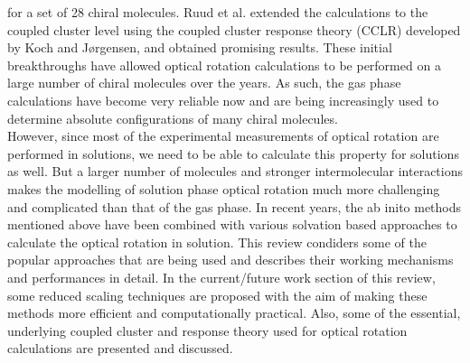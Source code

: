 for a set of 28 chiral molecules. Ruud et al. extended the calculations to the
coupled cluster level using the coupled cluster response
theory (CCLR) developed by Koch and J{\o}rgensen\cite{Koch90},
and obtained promising results\cite{Ruud03}. These initial breakthroughs have allowed optical
rotation calculations to be performed on a large number of chiral molecules over the years.  As
such, the gas phase calculations have become very reliable now and are being
increasingly used to determine absolute configurations of many chiral molecules.\cite{Kondru99} \\However, since most of the experimental measurements of optical rotation are
performed in solutions, we need to be able to calculate this property for solutions
as well. But a larger number of molecules and stronger intermolecular interactions
makes the modelling of solution phase optical rotation much more challenging and
complicated than that of the gas phase. In recent years, the ab inito methods
mentioned above have been combined with various solvation based
approaches\cite{Neugebauer05,Neugebauer09,Mennucci02,Tomasi05,JensenGordon96}
to calculate the optical rotation in solution. This review condiders some of
the popular approaches that are being used and describes their working
mechanisms and performances in detail. In the current/future work section of
this review, some reduced scaling techniques are proposed with the aim of
making these methods more efficient and computationally practical. Also, some
of the essential, underlying coupled cluster and response theory used for
optical rotation calculations are presented and discussed.

